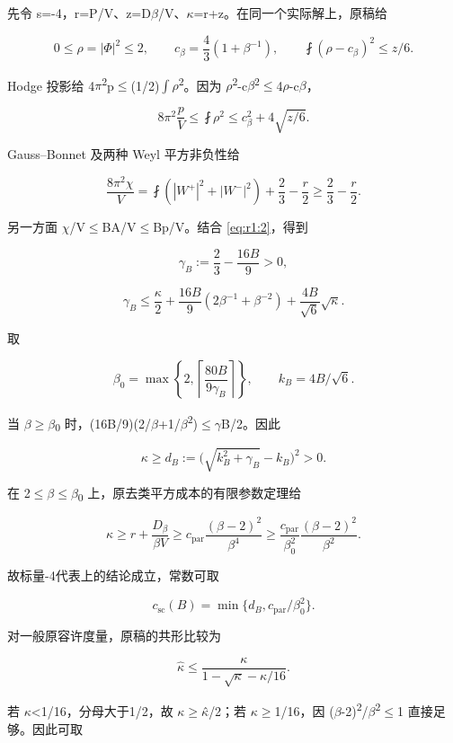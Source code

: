 \documentclass[UTF8,11pt,openany,oneside,fontset=none]{ctexbook}
\begin{document}
先令 s=-4，r=P/V、z=D\(\beta\)/V、\(\kappa\)=r+z。在同一个实际解上，原稿给

\[
0\le\rho=|\Phi|^2\le2,\qquad
c_\beta=\frac43(1+\beta^{-1}),\qquad
\fint(\rho-c_\beta)^2\le z/6.
\]

Hodge 投影给 4\(\pi\)\textsuperscript{2}p\(\le\)(1/2)\(\int\)\(\rho\)\textsuperscript{2}。因为 \textbar \(\rho\)\textsuperscript{2}-c\(\beta\)\textsuperscript{2}\textbar\(\le\)4\textbar \(\rho\)-c\(\beta\)\textbar，

\[
8\pi^2\frac pV\le\fint\rho^2
\le c_\beta^2+4\sqrt{z/6}.
\tag{1.2}\label{eq:r1:2}
\]

Gauss--Bonnet 及两种 Weyl 平方非负性给

\[
\frac{8\pi^2\chi}V
=\fint(|W^+|^2+|W^-|^2)+\frac23-\frac r2
\ge\frac23-\frac r2.
\]

另一方面 \(\chi\)/V\(\le\)BA/V\(\le\)Bp/V。结合 \eqref{eq:r1:2}，得到

\[
\gamma_B:=\frac23-\frac{16B}{9}>0,
\]

\[
\gamma_B\le\frac\kappa2+
\frac{16B}{9}(2\beta^{-1}+\beta^{-2})
+\frac{4B}{\sqrt6}\sqrt\kappa.
\tag{1.3}\label{eq:r1:3}
\]

取

\[
\beta_0=\max\left\{2,\left\lceil\frac{80B}{9\gamma_B}\right\rceil\right\},
\qquad k_B=4B/\sqrt6.
\]

当 \(\beta\)\(\ge\)\(\beta\)\textsubscript{0} 时，(16B/9)(2/\(\beta\)+1/\(\beta\)\textsuperscript{2})\(\le\)\(\gamma\)B/2。因此

\[
\kappa\ge d_B:=\bigl(\sqrt{k_B^2+\gamma_B}-k_B\bigr)^2>0.
\tag{1.4}\label{eq:r1:4}
\]

在 2\(\le\)\(\beta\)\(\le\)\(\beta\)\textsubscript{0} 上，原去类平方成本的有限参数定理给

\[
\kappa\ge r+\frac{D_\beta}{\beta V}
\ge c_{\mathrm{par}}\frac{(\beta-2)^2}{\beta^4}
\ge\frac{c_{\mathrm{par}}}{\beta_0^2}
\frac{(\beta-2)^2}{\beta^2}.
\]

故标量-4代表上的结论成立，常数可取

\[
c_{\mathrm{sc}}(B)=\min\{d_B,c_{\mathrm{par}}/\beta_0^2\}.
\]

对一般原容许度量，原稿的共形比较为

\[
\widehat\kappa\le
\frac{\kappa}{1-\sqrt\kappa-\kappa/16}.
\]

若 \(\kappa\)\textless1/16，分母大于1/2，故 \(\kappa\)\(\ge\)\(\kappa\)̂/2；若 \(\kappa\)\(\ge\)1/16，因 (\(\beta\)-2)\textsuperscript{2}/\(\beta\)\textsuperscript{2}\(\le\)1 直接足够。因此可取
\end{document}

